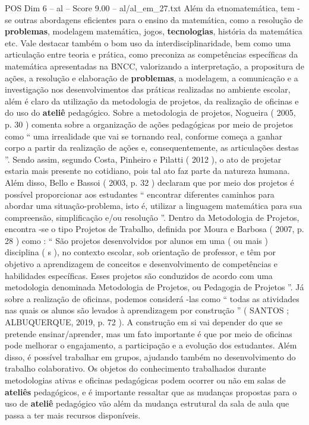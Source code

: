 \begin{textsample}{POS Dim 6 – al – Score 9.00 – al/al\_em\_27.txt}
Além da etnomatemática, tem -se outras abordagens eficientes para o ensino da matemática, como a resolução de \textbf{problemas}, modelagem matemática, jogos, \textbf{tecnologias}, história da matemática etc.
Vale destacar também o bom uso da interdisciplinaridade, bem como uma articulação entre teoria e prática, como preconiza as competências específicas da matemática apresentadas na BNCC, valorizando a interpretação, a propositura de ações, a resolução e elaboração de \textbf{problemas}, a modelagem, a comunicação e a investigação nos desenvolvimentos das práticas realizadas no ambiente escolar, além é claro da utilização da metodologia de projetos, da realização de oficinas e do uso do \textbf{ateliê} pedagógico.
Sobre a metodologia de projetos, Nogueira ( 2005, p. 30 ) comenta sobre a organização de ações pedagógicas por meio de projetos como “ uma irrealidade que vai se tornando real, conforme começa a ganhar corpo a partir da realização de ações e, consequentemente, as articulações destas ”.
Sendo assim, segundo Costa, Pinheiro e Pilatti ( 2012 ), o ato de projetar estaria mais presente no cotidiano, pois tal ato faz parte da natureza humana.
Além disso, Bello e Bassoi ( 2003, p. 32 ) declaram que por meio dos projetos é possível proporcionar aos estudantes “ encontrar diferentes caminhos para abordar uma situação-problema, isto é, utilizar a linguagem matemática para sua compreensão, simplificação e/ou resolução ”.
Dentro da Metodologia de Projetos, encontra -se o tipo Projetos de Trabalho, definida por Moura e Barbosa ( 2007, p. 28 ) como : “ São projetos desenvolvidos por alunos em uma ( ou mais ) disciplina ( s ), no contexto escolar, sob orientação de professor, e têm por objetivo a aprendizagem de conceitos e desenvolvimento de competências e habilidades específicas.
Esses projetos são conduzidos de acordo com uma metodologia denominada Metodologia de Projetos, ou Pedagogia de Projetos ”.
Já sobre a realização de oficinas, podemos considerá -las como “ todas as atividades nas quais os alunos são levados à aprendizagem por construção ” ( SANTOS ; ALBUQUERQUE, 2019, p. 72 ).
A construção em si vai depender do que se pretende ensinar/aprender, mas um fato importante é que por meio de oficinas pode melhorar o engajamento, a participação e a evolução dos estudantes.
Além disso, é possível trabalhar em grupos, ajudando também no desenvolvimento do trabalho colaborativo.
Os objetos do conhecimento trabalhados durante metodologias ativas e oficinas pedagógicas podem ocorrer ou não em salas de \textbf{ateliês} pedagógicos, e é importante ressaltar que as mudanças propostas para o uso de \textbf{ateliê} pedagógico vão além da mudança estrutural da sala de aula que passa a ter mais recursos disponíveis.

\end{textsample}
